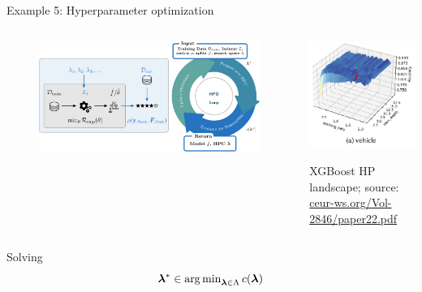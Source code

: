 \documentclass[11pt,compress,t,notes=noshow, xcolor=table]{beamer}
\begin{document}
\begin{vbframe}{Example 5: Hyperparameter optimization}
\begin{columns}
\begin{column}{0.6\textwidth}
\begin{figure}[h]
	\centering
	\includegraphics{figure_man/hpo_loop_1.png}
\end{figure}
\end{column}
\begin{column}{0.4\textwidth}
		\begin{center}
\includegraphics{figure_man/landscapes2.jpg}
\begin{tiny}{XGBoost HP landscape; source: \url{ceur-ws.org/Vol-2846/paper22.pdf}}\end{tiny}
\end{center}
\end{column}
\end{columns}

\framebreak 
		
Solving 
\vspace*{-0.2cm}
$$
\bm{\lambda}^\ast \in \operatorname{arg\,min}_{\bm{\lambda} \in \Lambda} c(\bm{\lambda})
$$


\end{vbframe}
\end{document}

